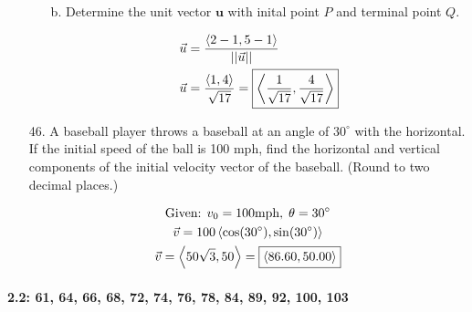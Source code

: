 \documentclass[10pt, letterpaper]{article}
\begin{document}
\begin{itemize}
\begin{mdframed}
\begin{itemize}
                \item[b.] Determine the unit vector $\mathbf{u}$ with inital point $P$ and terminal point $Q$.
                    
                    \begin{align*}
                        \vec{u} & = \frac{\expval{2 - 1, 5 - 1}}{||\vec{u}||}   \\
                        \vec{u} & = \frac{\expval{1, 4}}{\sqrt{17}} 
                                  = \boxed{\expval{\frac{1}{\sqrt{17}}, \frac{4}{\sqrt{17}}}}
                    \end{align*}
            \end{itemize}
            


        \end{mdframed}

        \item [46.] A baseball player throws a baseball at an angle of $30^{\circ}$ with the horizontal. If the initial speed of the ball is 100 mph, find the horizontal and vertical components of the initial velocity vector of the baseball. (Round to two decimal places.)
        
        \begin{mdframed}
            \begin{equation*}
                \begin{gathered}
                    \text{Given: } v_{0} = 100 \text{mph}, \; \theta = 30^{\circ}   \\
                    \vec{v} = 100\expval{\cos(30^{\circ}), \sin(30^{\circ})}        \\
                    \vec{v} = \expval{50\sqrt{3}, 50} = \boxed{\expval{86.60, 50.00}}
                \end{gathered}
            \end{equation*}
        \end{mdframed}

    \end{itemize}

    \pagebreak

    \paragraph*{2.2: 61, 64, 66, 68, 72, 74, 76, 78, 84, 89, 92, 100, 103}
    
\end{document}
